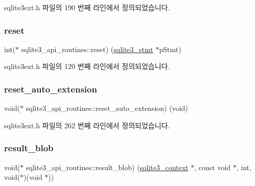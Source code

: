 sqlite3ext.\+h 파일의 190 번째 라인에서 정의되었습니다.

\mbox{\label{structsqlite3__api__routines_a88551d8943b8f9cdc7abebac90998ddf}} 
\subsubsection{\texorpdfstring{reset}{reset}}
{\footnotesize\ttfamily int($\ast$ sqlite3\+\_\+api\+\_\+routines\+::reset) (\hyperlink{sqlite3_8h_af2a033da1327cdd77f0a174a09aedd0c}{sqlite3\+\_\+stmt} $\ast$p\+Stmt)}



sqlite3ext.\+h 파일의 120 번째 라인에서 정의되었습니다.

\mbox{\label{structsqlite3__api__routines_a4424e3f8a5f42d705b4619c16959ef4a}} 
\subsubsection{\texorpdfstring{reset\+\_\+auto\+\_\+extension}{reset\_auto\_extension}}
{\footnotesize\ttfamily void($\ast$ sqlite3\+\_\+api\+\_\+routines\+::reset\+\_\+auto\+\_\+extension) (void)}



sqlite3ext.\+h 파일의 262 번째 라인에서 정의되었습니다.

\mbox{\label{structsqlite3__api__routines_a7151cedc160519771de48f9dab665356}} 
\subsubsection{\texorpdfstring{result\+\_\+blob}{result\_blob}}
{\footnotesize\ttfamily void($\ast$ sqlite3\+\_\+api\+\_\+routines\+::result\+\_\+blob) (\hyperlink{sqlite3_8h_a3b519553ffec8fc42b2356f5b1ebdc57}{sqlite3\+\_\+context} $\ast$, const void $\ast$, int, void($\ast$)(void $\ast$))}



